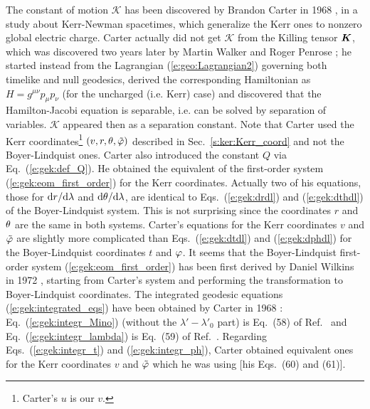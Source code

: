\begin{hist}
The constant of motion $\mathscr{K}$ has been discovered by Brandon Carter
in 1968 \cite{Carte68}, in a study about  Kerr-Newman spacetimes,
which generalize the Kerr ones to nonzero global electric charge.
Carter actually did not get $\mathscr{K}$ from the Killing tensor $\bm{K}$,
which was discovered two years later by Martin Walker and
Roger Penrose \cite{WalkeP70}; he
started instead from the Lagrangian (\ref{e:geo:Lagrangian2}) governing
both timelike and null geodesics,
derived the corresponding
Hamiltonian as $H = g^{\mu\nu} p_\mu p_\nu$ (for the uncharged (i.e. Kerr) case)
and discovered that the Hamilton-Jacobi equation
is separable, i.e. can be solved by separation of variables.
$\mathscr{K}$ appeared then as a separation constant. Note that Carter used
the Kerr coordinates\footnote{Carter's $u$ is our $v$.}
$(v,r,\theta,{\tilde\varphi})$ described in Sec.~\ref{s:ker:Kerr_coord}
and not the Boyer-Lindquist ones.
Carter also introduced
the constant $Q$ via Eq.~(\ref{e:gek:def_Q}). He obtained the equivalent
of the first-order system (\ref{e:gek:eom_first_order}) for the Kerr coordinates. Actually
two of his equations, those for $\mathrm{d} r/\mathrm{d}\lambda$ and $\mathrm{d}\theta/\mathrm{d}\lambda$, are
identical to Eqs.~(\ref{e:gek:drdl}) and (\ref{e:gek:dthdl}) of the Boyer-Lindquist
system. This is not surprising since the coordinates
$r$ and $\theta$ are the same in both systems. Carter's equations for the
Kerr coordinates $v$ and ${\tilde\varphi}$ are slightly more complicated than
Eqs.~(\ref{e:gek:dtdl}) and (\ref{e:gek:dphdl}) for the Boyer-Lindquist coordinates
$t$ and $\varphi$. It seems that the Boyer-Lindquist first-order system (\ref{e:gek:eom_first_order})
has been first derived by Daniel Wilkins in 1972 \cite{Wilki72},
starting from Carter's system and performing the transformation to Boyer-Lindquist
coordinates. The integrated geodesic equations (\ref{e:gek:integrated_eqs}) have
been obtained by Carter in 1968 \cite{Carte68}: Eq.~(\ref{e:gek:integr_Mino})
(without the $\lambda' - \lambda'_0$ part) is Eq.~(58) of Ref.~\cite{Carte68}
and Eq.~(\ref{e:gek:integr_lambda}) is Eq.~(59) of Ref.~\cite{Carte68}.
Regarding Eqs.~(\ref{e:gek:integr_t}) and (\ref{e:gek:integr_ph}), Carter
obtained equivalent ones for the Kerr coordinates $v$ and ${\tilde\varphi}$ which he was using
[his Eqs.~(60) and (61)].
\end{hist}


